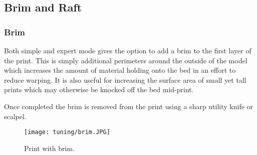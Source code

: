 
\subsection{Brim and Raft} %
\label{sec:brim_and_raft}

\subsubsection{Brim} %
\label{sub:brim}

Both simple and expert mode gives the option to add a brim to the first layer of the print.  This is simply additional perimeters around the outside of the model which increases the amount of material holding onto the bed in an effort to reduce warping.  It is also useful for increasing the surface area of small yet tall prints which may otherwise be knocked off the bed mid-print.

Once completed the brim is removed from the print using a sharp utility knife or scalpel.

\begin{figure}[H]
\centering
\texttt{[image: tuning/brim.JPG]}
\caption{Print with brim.}
\label{fig:print_with_brim}
\end{figure}


\begin{comment}

\subsubsection{Raft} %
\label{sub:raft}
\index{raft}

A technique dating back to the early days of 3D printing, a raft is a support structure printed underneath the model.  Because the raft extrusion is usually quite wide it adds more surface area for the print, and additionally covers any surface irregularities in the bed material, should they exist.  The raft technique is particularly popular when printing with ABS as it tends to warp more than PLA.

Again, the raft is expected to be removed manually after the print is completed.

A raft is added by turning on the support option and configuring how many layers should be printed to make up the raft.  As with support structures, the raft is printed rather loosely and the model is not pressed into it too much, in order that it may be easily removed afterwards.

\begin{figure}[H]
\centering
\texttt{[image: placeholder.jpg]}
\caption{Print with raft.}
\label{fig:print_with_raft}
\end{figure}

\end{comment}


